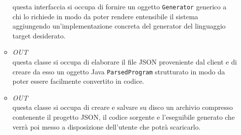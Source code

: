 \begin{itemize}
\begin{itemize}
questa interfaccia si occupa di fornire un oggetto \texttt{Generator} generico a chi lo richiede in modo da poter rendere entensibile il sistema aggiungendo un'implementazione concreta del generator del linguaggio target desiderato.
\item \textit{OUT} \hyperref[\nogloxy{swedesigner::server::parser::Parser}]{}\\
questa classe si occupa di elaborare il file JSON proveniente dal client e di creare da esso un oggetto Java \texttt{ParsedProgram} strutturato in modo da poter essere facilmente convertito in codice.
\item \textit{OUT} \hyperref[\nogloxy{swedesigner::server::utility::Compressor}]{}\\
questa classe si occupa di creare e salvare su disco un archivio compresso contenente il progetto JSON, il codice sorgente e l'eseguibile generato che verrà poi messo a disposizione dell'utente che potrà scaricarlo.
\end{itemize}
\end{itemize}
\subsection{}
\label{\nogloxy{swedesigner::server::generator}}
